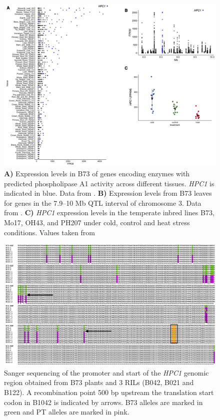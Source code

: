 \documentclass[9pt,twocolumn,twoside,lineno]{BioRxiv}
\begin{document}
\begin{figure}[t]
\begin{center}
\includegraphics[width=0.8\paperwidth]{Sup_Figures/Sup_Fig_5.png}
\caption{\textbf{A)} Expression levels in B73 of genes encoding enzymes with predicted phospholipase A1 activity across different tissues. \textit{HPC1} is indicated in blue. 
Data from \cite{Stelpflug2016-vr}.
\textbf{B)} Expression levels from B73 leaves for genes in the 7.9--10 Mb QTL interval of chromosome 3. 
Data from \cite{Stelpflug2016-vr}.
\textbf{C)} \textit{HPC1} expression levels in the temperate inbred lines B73, Mo17, OH43, and PH207 under cold, control and heat stress conditions. Values taken from \cite{Waters2017-nat}
} 
\label{SupFig5}
\end{center}
\end{figure} 

\clearpage

\begin{figure}[t]
\begin{center}
\includegraphics[width=0.9\paperwidth]{Sup_Figures/Sup_Fig_6.png}
\caption{Sanger sequencing of the promoter and start of the \textit{HPC1} genomic region obtained from B73 plants and 3 RILs (B042, B021 and B122). A recombination point 500 bp upstream the translation start codon in B1042 is indicated by arrows. B73 alleles are marked in green and PT alleles are marked in pink. 
}
\label{SupFig6}
\end{center}
\end{figure} 
\end{document}
